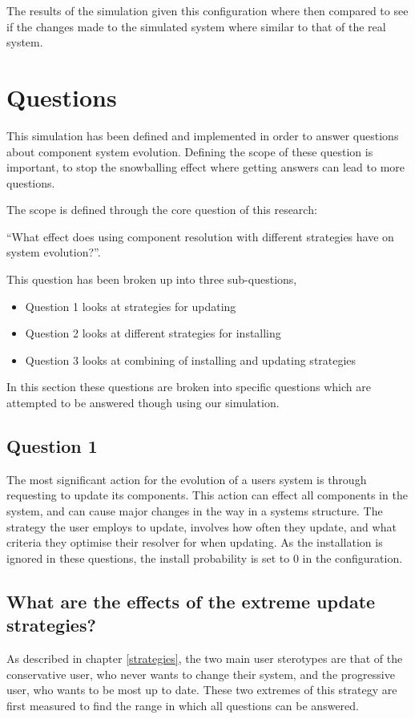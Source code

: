 The results of the simulation given this configuration where then compared to see if the changes made to the simulated system where similar to that of the real system.

\section{Questions}
This simulation has been defined and implemented in order to answer questions about component system evolution.
Defining the scope of these question is important, to stop the snowballing effect where getting answers can lead to more questions. 

The scope is defined through the core question of this research:

``What effect does using component resolution with different strategies have on system evolution?''.

This question has been broken up into three sub-questions,
\begin{itemize}
  \item Question 1 looks at strategies for updating
  \item Question 2 looks at different strategies for installing
  \item Question 3 looks at combining of installing and updating strategies
\end{itemize}

In this section these questions are broken into specific questions which are attempted to be answered though using our simulation.

\subsection{Question 1}
The most significant action for the evolution of a users system is through requesting to update its components.
This action can effect all components in the system, and can cause major changes in the way in a systems structure.
The strategy the user employs to update, involves how often they update, and what criteria they optimise their resolver for when updating.
As the installation is ignored in these questions, the install probability is set to 0 in the configuration.


\subsection{What are the effects of the extreme update strategies?}
As described in chapter \ref{strategies}, the two main user sterotypes are that of the conservative user, who never wants to change their system,
and the progressive user, who wants to be most up to date.
These two extremes of this strategy are first measured to find the range in which all questions can be answered.

